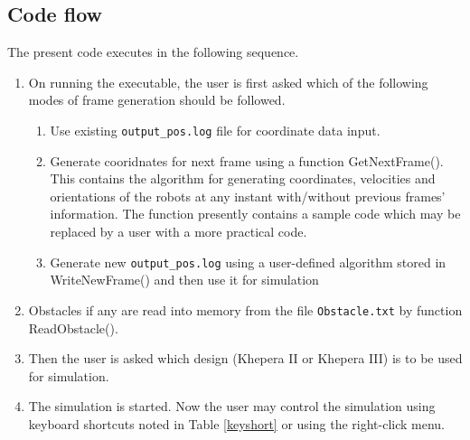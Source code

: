 \documentclass[10pt,a4paper]{article}
\begin{document}
\subsection{Code flow}
The present code executes in the following sequence.
\begin{enumerate}
\item On running the executable, the user is first asked which of the following modes of frame generation should be followed.
	\begin{enumerate}
	\item Use existing {\tt output\_pos.log} file for coordinate data input.
	\item Generate cooridnates for next frame using a function {\rm GetNextFrame()}. This contains the algorithm for generating coordinates, velocities and orientations of the robots at any instant with/without previous frames' information. The function presently contains a sample code which may be replaced by a user with a more practical code. 
	\item Generate new {\tt output\_pos.log} using a user-defined algorithm stored in {\rm WriteNewFrame()} and then use it for simulation
	\end{enumerate}
\item Obstacles if any are read into memory from the file {\tt Obstacle.txt} by function {\rm ReadObstacle()}.
\item Then the user is asked which design (Khepera II or Khepera III) is to be used for simulation.
\item The simulation is started. Now the user may control the simulation using keyboard shortcuts noted in Table \ref{keyshort} or using the right-click menu.
\end{enumerate}
\end{document}
